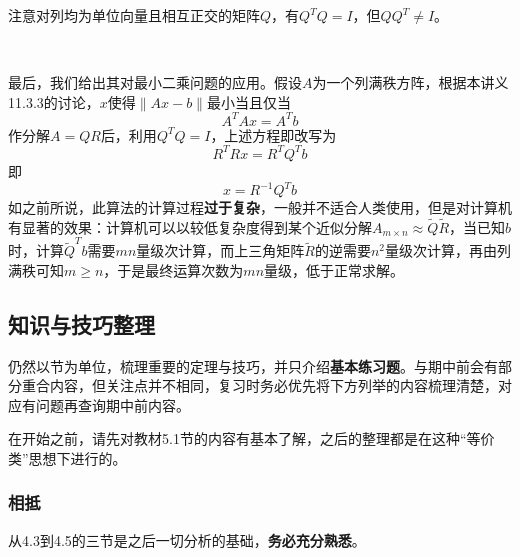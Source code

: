 \documentclass[a4paper,UTF8,fontset=windows]{ctexart}
\newcommand*{\note}{\noindent *}
\begin{document}
\note 注意对列均为单位向量且相互正交的矩阵$Q$，有$Q^TQ=I$，但$QQ^T\ne I$。

\

最后，我们给出其对最小二乘问题的应用。假设$A$为一个列满秩方阵，根据本讲义11.3.3的讨论，$x$使得$\|Ax-b\|$最小当且仅当
$$A^TAx=A^Tb$$
作分解$A=QR$后，利用$Q^TQ=I$，上述方程即改写为
$$R^TRx=R^TQ^Tb$$
即
$$x=R^{-1}Q^Tb$$
如之前所说，此算法的计算过程\textbf{过于复杂}，一般并不适合人类使用，但是对计算机有显著的效果：计算机可以以较低复杂度得到某个近似分解$A_{m\times n}\approx\tilde{Q}\tilde{R}$，当已知$b$时，计算$\tilde{Q}^Tb$需要$mn$量级次计算，而上三角矩阵$\tilde{R}$的逆需要$n^2$量级次计算，再由列满秩可知$m\ge n$，于是最终运算次数为$mn$量级，低于正常求解。

\subsection{知识与技巧整理}
\note 仍然以节为单位，梳理重要的定理与技巧，并只介绍\textbf{基本练习题}。与期中前会有部分重合内容，但关注点并不相同，复习时务必优先将下方列举的内容梳理清楚，对应有问题再查询期中前内容。

\note 在开始之前，请先对教材5.1节的内容有基本了解，之后的整理都是在这种``等价类''思想下进行的。

\subsubsection{相抵}
\note 从4.3到4.5的三节是之后一切分析的基础，\textbf{务必充分熟悉}。
\end{document}
